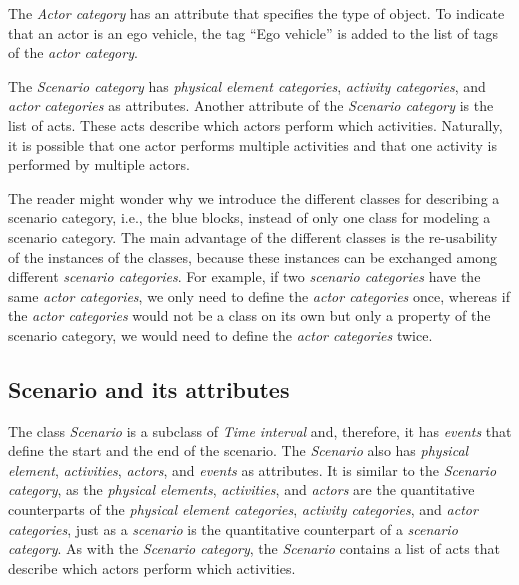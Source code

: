 The \textit{Actor category} has an attribute that specifies the type of object.
To indicate that an actor is an ego vehicle, the tag ``Ego vehicle'' is added to the list of tags of the \textit{actor category}.

The \textit{Scenario category} has \cstarte \textit{physical element categories}\cende, \textit{activity categories}, and \textit{actor categories} as attributes. 
Another attribute of the \textit{Scenario category} is the list of acts. %
These acts describe which actors perform which activities. Naturally, it is possible that one actor performs multiple activities and that one activity is performed by multiple actors.

The reader might wonder why we introduce the different classes for describing a scenario category, i.e., the blue blocks, instead of only one class for modeling a scenario category. 
The main advantage of the different classes is the re-usability of the instances of the classes, because these instances can be exchanged among different \textit{scenario categories}. For example, if two \textit{scenario categories} have the same \textit{actor categories}, we only need to define the \textit{actor categories} once, whereas if the \textit{actor categories} would not be a class on its own but only a property of the scenario category, we would need to define the \textit{actor categories} twice.



\subsection{Scenario and its attributes}
\label{sec:domain scenario}

\cstartb The class \textit{Scenario} is a subclass of \textit{Time interval} and, therefore, it has \textit{events} that define the start and the end of the scenario. \cendb
The \textit{Scenario} also has \cstarte\textit{physical element}\cende, \textit{activities}, \textit{actors}, and \textit{events} as attributes. 
It is similar to the \textit{Scenario category}, as the \cstarte\textit{physical elements}\cende, \textit{activities}, and \textit{actors} are the quantitative counterparts of the \cstarte\textit{physical element categories}\cende, \textit{activity categories}, \cendb and \textit{actor categories}, just as a \textit{scenario} is the quantitative counterpart of a \textit{scenario category}. 
As with the \textit{Scenario category}, the \textit{Scenario} contains a list of acts that describe which actors perform which activities.

